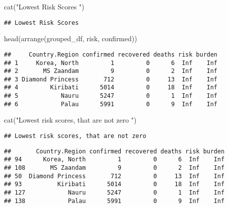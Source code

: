\documentclass[
]{article}
\newenvironment{Shaded}{\begin{snugshade}}{\end{snugshade}}
\newcommand{\DecValTok}[1]{\textcolor[rgb]{0.00,0.00,0.81}{#1}}
\newcommand{\FunctionTok}[1]{\textcolor[rgb]{0.00,0.00,0.00}{#1}}
\newcommand{\NormalTok}[1]{#1}
\newcommand{\SpecialCharTok}[1]{\textcolor[rgb]{0.00,0.00,0.00}{#1}}
\newcommand{\StringTok}[1]{\textcolor[rgb]{0.31,0.60,0.02}{#1}}
\begin{document}
\begin{Shaded}
\begin{Highlighting}[]
\FunctionTok{cat}\NormalTok{(}\StringTok{"Lowest Risk Scores "}\NormalTok{)}
\end{Highlighting}
\end{Shaded}

\begin{verbatim}
## Lowest Risk Scores
\end{verbatim}

\begin{Shaded}
\begin{Highlighting}[]
\FunctionTok{head}\NormalTok{(}\FunctionTok{arrange}\NormalTok{(grouped\_df, risk, confirmed))}
\end{Highlighting}
\end{Shaded}

\begin{verbatim}
##     Country.Region confirmed recovered deaths risk burden
## 1     Korea, North         1         0      6  Inf    Inf
## 2       MS Zaandam         9         0      2  Inf    Inf
## 3 Diamond Princess       712         0     13  Inf    Inf
## 4         Kiribati      5014         0     18  Inf    Inf
## 5            Nauru      5247         0      1  Inf    Inf
## 6            Palau      5991         0      9  Inf    Inf
\end{verbatim}

\begin{Shaded}
\begin{Highlighting}[]
\FunctionTok{cat}\NormalTok{(}\StringTok{"Lowest risk scores, that are not zero "}\NormalTok{)}
\end{Highlighting}
\end{Shaded}

\begin{verbatim}
## Lowest risk scores, that are not zero
\end{verbatim}

\begin{Shaded}
\end{Shaded}

\begin{verbatim}
##       Country.Region confirmed recovered deaths risk burden
## 94      Korea, North         1         0      6  Inf    Inf
## 108       MS Zaandam         9         0      2  Inf    Inf
## 50  Diamond Princess       712         0     13  Inf    Inf
## 93          Kiribati      5014         0     18  Inf    Inf
## 127            Nauru      5247         0      1  Inf    Inf
## 138            Palau      5991         0      9  Inf    Inf
\end{verbatim}
\end{document}
